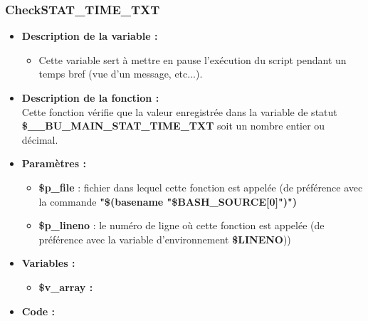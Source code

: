 \documentclass[a4paper,10pt]{article}
\begin{document}
\color{blue}
\subsubsection{CheckSTAT\_TIME\_TXT}\color{white}

\begin{itemize}
    \item \textbf{Description de la variable :}
    \begin{itemize}
        \item Cette variable sert à mettre en pause l'exécution du script pendant un temps bref (vue d'un message, etc...).\\[1\baselineskip]
    \end{itemize}

    \item \textbf{Description de la fonction :}\\
    Cette fonction vérifie que la valeur enregistrée dans la variable de statut \textbf{\color{orange}\$\_\_BU\_MAIN\_STAT\_TIME\_TXT} soit un nombre entier ou décimal.\\[1\baselineskip]

    \item \textbf{Paramètres :}
    \begin{itemize}
        \item \color{orange}\textbf{\$p\_file}\color{white} : fichier dans lequel cette fonction est appelée (de préférence avec la commande \textbf{"\$(\color{gray}basename \color{white}"\color{orange}\$BASH\_SOURCE[0]\color{white}")")}\\[1\baselineskip]

        \item \color{orange}\textbf{\$p\_lineno}\color{white} : le numéro de ligne où cette fonction est appelée (de préférence avec la variable d'environnement \textbf{\color{orange}\$LINENO}))\\[1\baselineskip]
    \end{itemize}

        
    

    \item \textbf{Variables :}
    \begin{itemize}
        \item \textbf{\color{orange}\$v\_array\color{white} :}\\[1\baselineskip]
    \end{itemize}

    \item \textbf{Code :}
\end{itemize}
\end{document}
